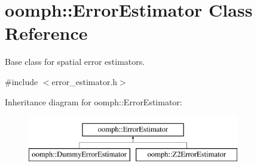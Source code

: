 \hypertarget{classoomph_1_1ErrorEstimator}{}\section{oomph\+:\+:Error\+Estimator Class Reference}
\label{classoomph_1_1ErrorEstimator}


Base class for spatial error estimators.  




{\ttfamily \#include $<$error\+\_\+estimator.\+h$>$}

Inheritance diagram for oomph\+:\+:Error\+Estimator\+:\begin{figure}[H]
\begin{center}
\leavevmode
\includegraphics[height=2.000000cm]{classoomph_1_1ErrorEstimator}
\end{center}
\end{figure}
